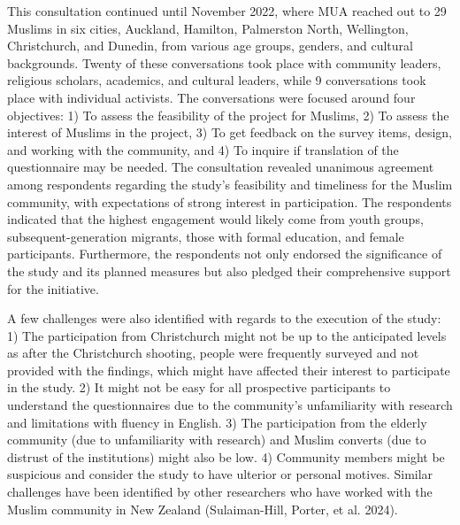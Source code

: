 \documentclass[
]{interact}
\begin{document}
This consultation continued until November 2022, where MUA reached out
to 29 Muslims in six cities, Auckland, Hamilton, Palmerston North,
Wellington, Christchurch, and Dunedin, from various age groups, genders,
and cultural backgrounds. Twenty of these conversations took place with
community leaders, religious scholars, academics, and cultural leaders,
while 9 conversations took place with individual activists. The
conversations were focused around four objectives: 1) To assess the
feasibility of the project for Muslims, 2) To assess the interest of
Muslims in the project, 3) To get feedback on the survey items, design,
and working with the community, and 4) To inquire if translation of the
questionnaire may be needed. The consultation revealed unanimous
agreement among respondents regarding the study's feasibility and
timeliness for the Muslim community, with expectations of strong
interest in participation. The respondents indicated that the highest
engagement would likely come from youth groups, subsequent-generation
migrants, those with formal education, and female participants.
Furthermore, the respondents not only endorsed the significance of the
study and its planned measures but also pledged their comprehensive
support for the initiative.

A few challenges were also identified with regards to the execution of
the study: 1) The participation from Christchurch might not be up to the
anticipated levels as after the Christchurch shooting, people were
frequently surveyed and not provided with the findings, which might have
affected their interest to participate in the study. 2) It might not be
easy for all prospective participants to understand the questionnaires
due to the community's unfamiliarity with research and limitations with
fluency in English. 3) The participation from the elderly community (due
to unfamiliarity with research) and Muslim converts (due to distrust of
the institutions) might also be low. 4) Community members might be
suspicious and consider the study to have ulterior or personal motives.
Similar challenges have been identified by other researchers who have
worked with the Muslim community in New Zealand (Sulaiman-Hill, Porter,
et al. 2024).
\end{document}
